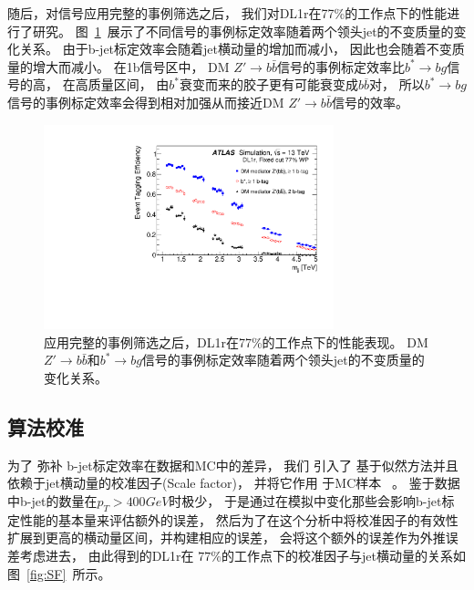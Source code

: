 随后，对信号应用完整的事例筛选之后，
我们对DL1r在77\%的工作点下的性能进行了研究。
图~\ref{fig:beff}~展示了不同信号的事例标定效率随着两个领头jet的不变质量的变化关系。
由于b-jet标定效率会随着jet横动量的增加而减小，
因此也会随着不变质量的增大而减小。
在1b信号区中，
DM $Z\prime\rightarrow b\bar{b}$信号的事例标定效率比$b^* \to bg$信号的高，
在高质量区间，
由$b^*$衰变而来的胶子更有可能衰变成$b\overline{b}$对，
所以$b^* \to bg$信号的事例标定效率会得到相对加强从而接近DM $Z\prime\rightarrow b\bar{b}$信号的效率。　

\begin{figure}[htbp]
  \centering
  \includegraphics[width=0.75\textwidth]{figs/fig_02.pdf}
  \caption{
  应用完整的事例筛选之后，DL1r在77\%的工作点下的性能表现。
  DM $Z\prime\rightarrow b\bar{b}$和$b^* \to bg$信号的事例标定效率随着两个领头jet的不变质量的变化关系。
  }
  \label{fig:beff}
\end{figure}


\subsection{算法校准}
\label{sec:DijetBtagging4}

为了
弥补
b-jet标定效率在数据和MC中的差异，
我们
引入了
基于似然方法并且
依赖于jet横动量的校准因子(Scale factor)，
并将它作用
于MC样本
~\cite{FTAG-2018-01}。
鉴于数据中b-jet的数量在$p_{T}>400GeV$时极少，
于是通过在模拟中变化那些会影响b-jet标定性能的基本量来评估额外的误差，
然后为了在这个分析中将校准因子的有效性扩展到更高的横动量区间，并构建相应的误差，
会将这个额外的误差作为外推误差考虑进去，
由此得到的DL1r在
$77\%$的工作点下的校准因子与jet横动量的关系如图~\ref{fig:SF}~所示。




